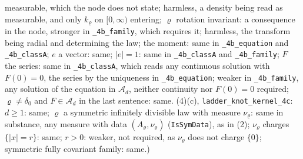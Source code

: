 \begin{proposition}
{measurable, which the node does not state; harmless, a density being read as measurable, and
only $k_\varrho$ on $[0,\infty)$ entering; $\varrho$ rotation invariant: a consequence in the node,
stronger in \texttt{\_4b\_family}, which requires it; harmless, the transform being radial and
determining the law; the moment: same in \texttt{\_4b\_equation} and \texttt{\_4b\_classA}; $e$ a
vector: same; $|e| = 1$: same in \texttt{\_4b\_classA} and \texttt{\_4b\_family}; $F$ the series:
same in \texttt{\_4b\_classA}, which reads any continuous solution with $F(0) = 0$, the series by
the uniqueness in \texttt{\_4b\_equation}; weaker in \texttt{\_4b\_family}, any solution of the
equation in $\mathcal{A}_d$, neither continuity nor $F(0) = 0$ required; $\varrho \ne \delta_0$ and
$F \in \mathcal{A}_d$ in the last sentence: same. (4)(c), \texttt{ladder\_knot\_kernel\_4c}:
$d \ge 1$: same; $\varrho$ a symmetric infinitely divisible law with \Levy{} measure $\nu_\varrho$:
same in substance, any measure with data $(A_\varrho, \nu_\varrho)$ (\texttt{IsSymData}), as in
(2); $\nu_\varrho$ charges $\{|x| = r\}$: same; $r > 0$: weaker, not required, as $\nu_\varrho$ does
not charge $\{0\}$; symmetric fully covariant family: same.)}
\end{proposition}

